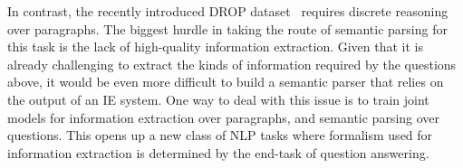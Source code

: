 In contrast, the recently introduced DROP dataset~\citep{drop}
requires discrete reasoning over paragraphs. 
The biggest hurdle in taking the route of semantic
parsing for this task is the lack of high-quality information extraction. Given that it is
already challenging to extract the kinds of information required by the
questions above, it would be even more difficult to build a semantic parser that
relies on the output of an IE system. One way to deal with this issue is to
train joint models for information extraction over paragraphs, and semantic
parsing over questions. This opens up a new class of NLP tasks where formalism
used for information extraction is determined by the end-task of question
answering.
